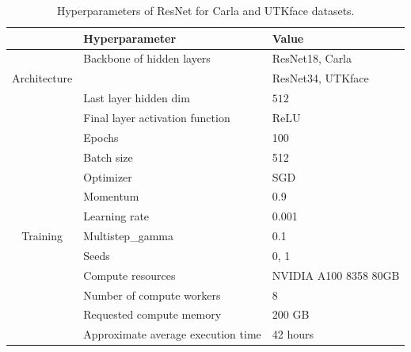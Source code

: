 \begin{table}[h!]
\caption{Hyperparameters of ResNet for Carla and UTKface datasets.}
\label{table:carla_resnet18}
\vskip 0.15in
\begin{center}
\begin{small}
\begin{tabular}{cll}
\toprule
    & \textbf{Hyperparameter} & \textbf{Value}  \\
\midrule
    & Backbone of hidden layers & ResNet18, Carla \\
  Architecture    & & ResNet34, UTKface \\
    & Last layer hidden dim & $512$  \\ 
    & Final layer activation function & ReLU  \\ 
\midrule
    & Epochs & 100 \\
    & Batch size & 512 \\
    & Optimizer & SGD \\
    & Momentum & 0.9 \\
    & Learning rate & 0.001 \\
Training     & Multistep\_gamma & 0.1 \\
    & Seeds & 0, 1\\
    & Compute resources & NVIDIA A100 8358 80GB \\
    & Number of compute workers & 8 \\
    & Requested compute memory & 200 GB \\
    & Approximate average execution time & 42 hours\\
    
\bottomrule
\end{tabular}
\end{small}
\end{center}
\end{table} 